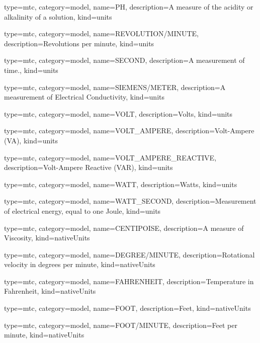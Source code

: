 {
  type=mtc,
  category=model,
  name={PH},
  description={A measure of the acidity or alkalinity of a solution},
  kind={units}
}


{
  type=mtc,
  category=model,
  name={REVOLUTION/MINUTE},
  description={Revolutions per minute},
  kind={units}
}


{
  type=mtc,
  category=model,
  name={SECOND},
  description={A measurement of time.},
  kind={units}
}


{
  type=mtc,
  category=model,
  name={SIEMENS/METER},
  description={A measurement of Electrical Conductivity},
  kind={units}
}


{
  type=mtc,
  category=model,
  name={VOLT},
  description={Volts},
  kind={units}
}


{
  type=mtc,
  category=model,
  name={VOLT\_AMPERE},
  description={Volt-Ampere  (VA)},
  kind={units}
}


{
  type=mtc,
  category=model,
  name={VOLT\_AMPERE\_REACTIVE},
  description={Volt-Ampere Reactive  (VAR)},
  kind={units}
}


{
  type=mtc,
  category=model,
  name={WATT},
  description={Watts},
  kind={units}
}


{
  type=mtc,
  category=model,
  name={WATT\_SECOND},
  description={Measurement of electrical energy, equal to one Joule},
  kind={units}
}


{
  type=mtc,
  category=model,
  name={CENTIPOISE},
  description={A measure of Viscosity},
  kind={nativeUnits}
}


{
  type=mtc,
  category=model,
  name={DEGREE/MINUTE},
  description={Rotational velocity in degrees per minute},
  kind={nativeUnits}
}


{
  type=mtc,
  category=model,
  name={FAHRENHEIT},
  description={Temperature in Fahrenheit},
  kind={nativeUnits}
}


{
  type=mtc,
  category=model,
  name={FOOT},
  description={Feet},
  kind={nativeUnits}
}


{
  type=mtc,
  category=model,
  name={FOOT/MINUTE},
  description={Feet per minute},
  kind={nativeUnits}
}


